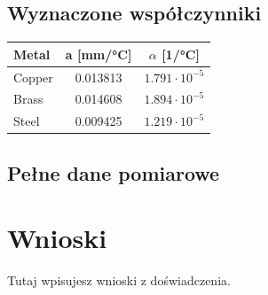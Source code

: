 \documentclass[a4paper,12pt]{article} %
\begin{document}
\subsection*{Wyznaczone współczynniki}

\begin{tabular}{l c c}
\toprule
Metal & a [mm/°C] & $\alpha$ [1/°C] \\
\midrule
Copper & 0.013813 & $1.791 \cdot 10^{-5}$ \\
Brass  & 0.014608 & $1.894 \cdot 10^{-5}$ \\
Steel  & 0.009425 & $1.219 \cdot 10^{-5}$ \\
\bottomrule
\end{tabular}

\subsection*{Pełne dane pomiarowe}


\section{Wnioski}
Tutaj wpisujesz wnioski z doświadczenia.
\end{document}
